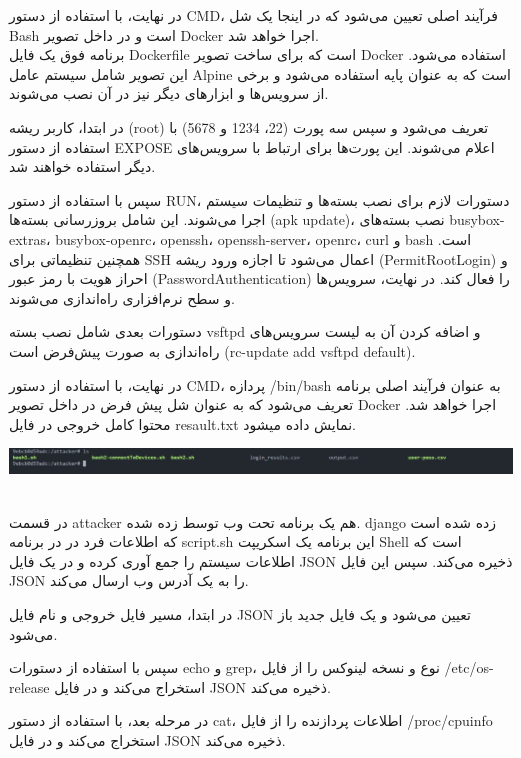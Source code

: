 \documentclass[oneside]{report}
\begin{document}
در نهایت، با استفاده از دستور CMD، فرآیند اصلی تعیین می‌شود که در اینجا یک شل Bash است و در داخل تصویر Docker اجرا خواهد شد.
\\
برنامه فوق یک فایل Dockerfile است که برای ساخت تصویر Docker استفاده می‌شود. این تصویر شامل سیستم عامل Alpine است که به عنوان پایه استفاده می‌شود و برخی از سرویس‌ها و ابزارهای دیگر نیز در آن نصب می‌شوند.

در ابتدا، کاربر ریشه (root) تعریف می‌شود و سپس سه پورت (22، 1234 و 5678) با استفاده از دستور EXPOSE اعلام می‌شوند. این پورت‌ها برای ارتباط با سرویس‌های دیگر استفاده خواهند شد.

سپس با استفاده از دستور RUN، دستورات لازم برای نصب بسته‌ها و تنظیمات سیستم اجرا می‌شوند. این شامل بروزرسانی بسته‌ها (apk update)، نصب بسته‌های busybox-extras، busybox-openrc، openssh، openssh-server، openrc، curl و bash است. همچنین تنظیماتی برای SSH اعمال می‌شود تا اجازه ورود ریشه (PermitRootLogin) و احراز هویت با رمز عبور (PasswordAuthentication) را فعال کند. در نهایت، سرویس‌ها و سطح نرم‌افزاری راه‌اندازی می‌شوند.

دستورات بعدی شامل نصب بسته vsftpd و اضافه کردن آن به لیست سرویس‌های راه‌اندازی به صورت پیش‌فرض است (rc-update add vsftpd default).

در نهایت، با استفاده از دستور CMD، پردازه /bin/bash به عنوان فرآیند اصلی برنامه تعریف می‌شود که به عنوان شل پیش فرض در داخل تصویر Docker اجرا خواهد شد.
محتوا کامل خروجی در فایل resault.txt  نمایش داده میشود.

\begin{center}
    \includegraphics[width=1\linewidth]{attacker_container.png}
\end{center}

\\
در قسمت attacker  هم یک برنامه تحت وب توسط زده شده. django زده شده است که اطلاعات فرد در
در برنامه script.sh این برنامه یک اسکریپت Shell است که اطلاعات سیستم را جمع آوری کرده و در یک فایل JSON ذخیره می‌کند. سپس این فایل JSON را به یک آدرس وب ارسال می‌کند.

در ابتدا، مسیر فایل خروجی و نام فایل JSON تعیین می‌شود و یک فایل جدید باز می‌شود.

سپس با استفاده از دستورات echo و grep، نوع و نسخه لینوکس را از فایل /etc/os-release استخراج می‌کند و در فایل JSON ذخیره می‌کند.

در مرحله بعد، با استفاده از دستور cat، اطلاعات پردازنده را از فایل /proc/cpuinfo استخراج می‌کند و در فایل JSON ذخیره می‌کند.
\end{document}
